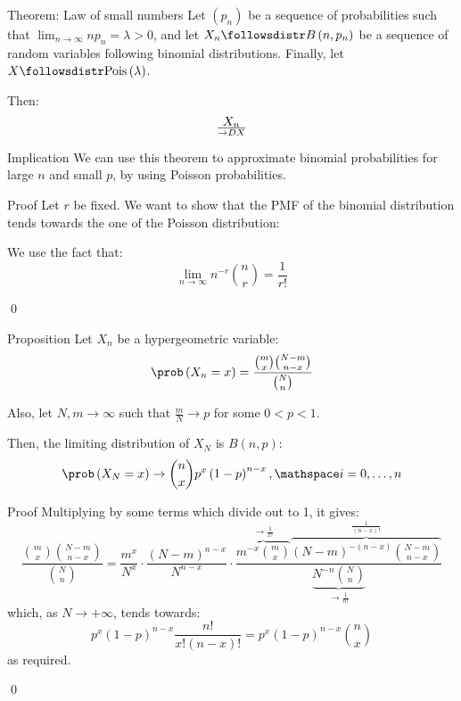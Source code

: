 \documentclass[a4paper]{article}
\begin{document}
\begin{parag}{Theorem: Law of small numbers}
    Let $\left(p_n\right)$ be a sequence of probabilities such that $\lim_{n \to \infty} n p_n = \lambda > 0$, and let $X_n \followsdistr B\left(n, p_n\right)$ be a sequence of random variables following binomial distributions. Finally, let $X \followsdistr \text{Pois}\left(\lambda\right)$.

    Then:
    \[X_n \over{\to}{D} X\]

    \begin{subparag}{Implication}
        We can use this theorem to approximate binomial probabilities for large $n$ and small $p$, by using Poisson probabilities.
    \end{subparag}
    
    
    \begin{subparag}{Proof}
        Let $r$ be fixed. We want to show that the PMF of the binomial distribution tends towards the one of the Poisson distribution:
        
        We use the fact that: 
        \[\lim_{n \to \infty} n^{-r} \binom{n}{r} = \frac{1}{r!}\]

        \qed
    \end{subparag}
\end{parag}

\begin{parag}{Proposition}
    Let $X_n$ be a hypergeometric variable: 
    \[\prob\left(X_n = x\right) = \frac{\binom{m}{x} \binom{N-m}{n-x}}{\binom{N}{n}}\]
    
    Also, let $N, m \to \infty$ such that $\frac{m}{N} \to p$ for some $0 < p < 1$. 

    Then, the limiting distribution of $X_N$ is $B\left(n, p\right)$: 
    \[\prob\left(X_N = x\right) \to \binom{n}{x} p^x \left(1-p\right)^{n-x}, \mathspace i = 0, \ldots, n\]
     
    \begin{subparag}{Proof}
        Multiplying by some terms which divide out to 1, it gives: 
        \[\frac{\binom{m}{x} \binom{N-m}{n-x}}{\binom{N}{n}} = \frac{m^x}{N^x}\cdot \frac{\left(N - m\right)^{n-x}}{N^{n-x}} \cdot  \frac{\overbrace{m^{-x} \binom{m}{x}}^{\to \frac{1}{x!}}\overbrace{\left(N - m\right)^{-\left(n-x\right)}\binom{N-m}{n-x}}^{\frac{1}{\left(n-x\right)!}}}{\underbrace{N^{-n} \binom{N}{n}}_{\to \frac{1}{n!}}}\]
        which, as $N \to +\infty$, tends towards:
        \[p^{x} \left(1-p\right)^{n-x} \frac{n!}{x! \left(n-x\right)!} = p^x \left(1-p\right)^{n-x} \binom{n}{x}\]
        as required.

        \qed
    \end{subparag}
\end{parag}
\end{document}
